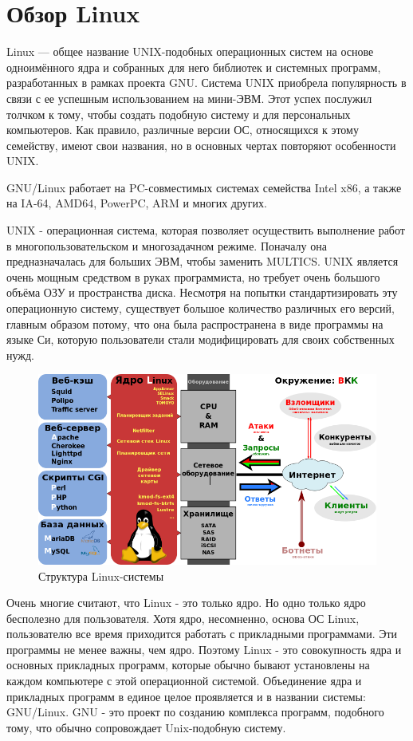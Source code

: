 \section{Обзор Linux}
Linux — общее название UNIX-подобных операционных систем на основе одноимённого ядра и собранных для него библиотек и системных программ, разработанных в рамках проекта GNU.
Система UNIX приобрела популярность в связи с ее успешным использованием на мини-ЭВМ. Этот успех послужил толчком к тому, чтобы создать подобную систему и для персональных компьютеров. Как правило, различные версии ОС, относящихся к этому семейству, имеют свои названия, но в основных чертах повторяют особенности UNIX.

GNU/Linux работает на PC-совместимых системах семейства Intel x86, а также на IA-64, AMD64, PowerPC, ARM и многих других.

UNIX - операционная система, которая позволяет осуществить выполнение работ в многопользовательском и многозадачном режиме. Поначалу она предназначалась для больших ЭВМ, чтобы заменить MULTICS. UNIX является очень мощным средством в руках программиста, но требует очень большого объёма ОЗУ и пространства диска. Несмотря на попытки стандартизировать эту операционную систему, существует большое количество различных его версий, главным образом потому, что она была распространена в виде программы на языке Си, которую пользователи стали модифицировать для своих собственных нужд.

\begin{figure}
	\centering
	\includegraphics[width=\textwidth]{figures/LAMP_software_bundle}
	\caption{Структура Linux-системы}
	\label{fig:fig01}
\end{figure}

Очень многие считают, что Linux - это только ядро. Но одно только ядро бесполезно для пользователя. Хотя ядро, несомненно, основа ОС Linux, пользователю все время приходится работать с прикладными программами. Эти программы не менее важны, чем ядро. Поэтому Linux - это совокупность ядра и основных прикладных программ, которые обычно бывают установлены на каждом компьютере с этой операционной системой. Объединение ядра и прикладных программ в единое целое проявляется и в названии системы: GNU/Linux. GNU - это проект по созданию комплекса программ, подобного тому, что обычно сопровождает Unix-подобную систему.

